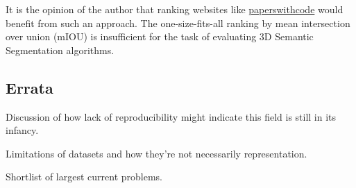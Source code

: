 It is the opinion of the author that ranking websites like \href{https://paperswithcode.com/}{paperswithcode} would benefit from such an approach. The one-size-fits-all ranking by mean intersection over union (mIOU) is insufficient for the task of evaluating 3D Semantic Segmentation algorithms.

\subsection{Errata}
\label{errata}

Discussion of how lack of reproducibility might indicate this field is still in its infancy.

Limitations of datasets and how they're not necessarily representation.

Shortlist of largest current problems.


\newpage
